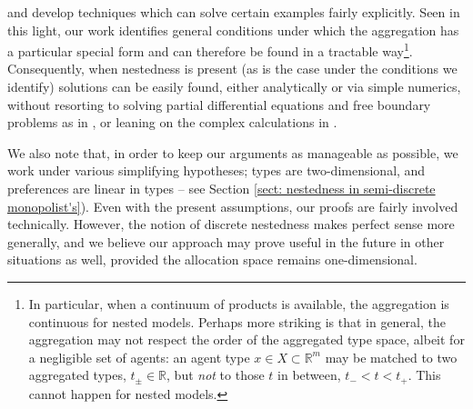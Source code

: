 \documentclass[12pt,reqno]{amsart}
\begin{document}
and develop techniques which can solve certain examples fairly explicitly. Seen in this light, our work identifies general conditions under which the aggregation has a particular special form and can therefore be found in a tractable way\footnote{In particular, when a continuum of products is available, the aggregation is continuous for nested models.  Perhaps more striking is that in general, the aggregation may not respect the order of the aggregated type space, albeit for a negligible set of agents: an agent type $x \in X\subset \mathbb{R}^m$ may be matched to two aggregated types, $t_\pm \in \mathbb{R}$, but \emph{not} to those  $t$ in between, $t_- <t<t_+$.  This cannot happen for nested models. }. Consequently, when nestedness is present (as is the case under the conditions we identify) solutions can be easily found, either analytically or via simple numerics, without resorting to solving partial differential equations and free boundary problems as in \cite{RochetChone98}, or leaning on the complex calculations in \cite{Deneckere}.  %

We also note that, in order to keep our arguments as manageable as possible, we work under various simplifying hypotheses; types are two-dimensional, and preferences are linear in types  -- see Section \ref{sect: nestedness in semi-discrete monopolist's}).  Even with the present assumptions, our proofs are fairly involved technically. However, the notion of discrete nestedness makes perfect sense more generally, and we believe our approach may prove useful in the future in other situations as well, provided the allocation space remains one-dimensional.
\end{document}
